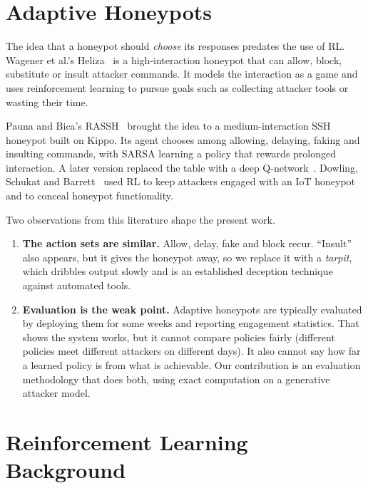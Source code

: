 \section{Adaptive Honeypots}

The idea that a honeypot should \emph{choose} its responses predates the use of RL. Wagener
et al.'s Heliza~\cite{wagener2011heliza} is a high-interaction honeypot that can allow, block,
substitute or insult attacker commands. It models the interaction as a game and uses
reinforcement learning to pursue goals such as collecting attacker tools or wasting their time.

Pauna and Bica's RASSH~\cite{pauna2014rassh} brought the idea to a medium-interaction SSH
honeypot built on Kippo. Its agent chooses among allowing, delaying, faking and insulting
commands, with SARSA learning a policy that rewards prolonged interaction. A later version
replaced the table with a deep Q-network~\cite{pauna2018qrassh}. Dowling, Schukat and
Barrett~\cite{dowling2018conceal} used RL to keep attackers engaged with an IoT honeypot and
to conceal honeypot functionality.

Two observations from this literature shape the present work.

\begin{enumerate}
  \item \textbf{The action sets are similar.} Allow, delay, fake and block recur. ``Insult''
    also appears, but it gives the honeypot away, so we replace it with a \emph{tarpit}, which
    dribbles output slowly and is an established deception technique against automated tools.
  \item \textbf{Evaluation is the weak point.} Adaptive honeypots are typically evaluated by
    deploying them for some weeks and reporting engagement statistics. That shows the system
    works, but it cannot compare policies fairly (different policies meet different attackers
    on different days). It also cannot say how far a learned policy is from what is achievable.
    Our contribution is an evaluation methodology that does both, using exact computation on a
    generative attacker model.
\end{enumerate}

\section{Reinforcement Learning Background}

